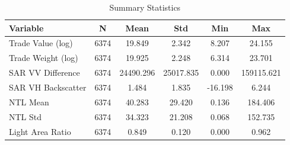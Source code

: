 \begin{table}[ht]
\centering
\caption{Summary Statistics}
\begin{tabular}{lccccc}
\toprule
Variable & N & Mean & Std & Min & Max \\
\midrule
Trade Value (log) & 6374 & 19.849 & 2.342 & 8.207 & 24.155 \\
Trade Weight (log) & 6374 & 19.925 & 2.248 & 6.314 & 23.701 \\
SAR VV Difference & 6374 & 24490.296 & 25017.835 & 0.000 & 159115.621 \\
SAR VH Backscatter & 6374 & 1.484 & 1.835 & -16.198 & 6.244 \\
NTL Mean & 6374 & 40.283 & 29.420 & 0.136 & 184.406 \\
NTL Std & 6374 & 34.323 & 21.208 & 0.068 & 152.735 \\
Light Area Ratio & 6374 & 0.849 & 0.120 & 0.000 & 0.962 \\
\bottomrule
\end{tabular}
\end{table}